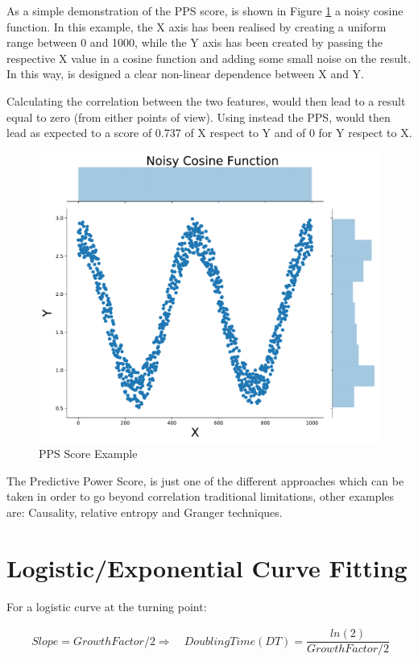 \begin{appendices}
As a simple demonstration of the PPS score, is shown in Figure \ref{pps_ex} a noisy cosine function. In this example, the X axis has been realised by creating a uniform range between 0 and 1000, while the Y axis has been created by passing the respective X value in a cosine function and adding some small noise on the result. In this way, is designed a clear non-linear dependence between X and Y. 

Calculating the correlation between the two features, would then lead to a result equal to zero (from either points of view). Using instead the PPS, would then lead as expected to a score of 0.737 of X respect to Y and of 0 for Y respect to X. 

\begin{figure}[ht!]%
    \centering
    \includegraphics[width=0.45\linewidth]{latex/images/pps_ex.pdf}
    \vspace{-0.2cm}
    \caption{PPS Score Example}
    \label{pps_ex}
\end{figure}

The Predictive Power Score, is just one of the different approaches which can be taken in order to go beyond correlation traditional limitations, other examples are: Causality, relative entropy and Granger techniques.

\clearpage

\section{Logistic/Exponential Curve Fitting}
\label{exp_fit}

For a logistic curve at the turning point: 

\useshortskip
\begin{align}
\ Slope = Growth Factor/2 \Rightarrow\quad Doubling Time (DT) = \dfrac{ln(2)}{Growth Factor/2}
\end{align}
\useshortskip


\end{appendices}

